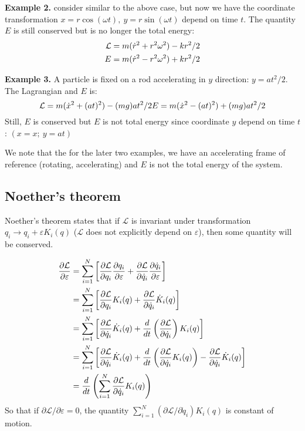 \documentclass{article}
\newcommand{\pfrac}[2]{\frac{\partial #1}{\partial #2}}
\newcommand{\ddt}[1]{\frac{d}{dt}\left( #1 \right)}
\renewcommand{\L}{\mathcal{L}}
\newcommand{\dotx}{\dot{x}}
\newcommand{\dotq}{\dot{q}}
\begin{document}
\textbf{Example 2.}
consider similar to the above case, but now we have the coordinate transformation 
$x = r\cos(\omega t),\ y = r\sin(\omega t)$ depend on time $t$. The quantity
$E$ is still conserved but is no longer the total energy:
\begin{align}
    \L = m(\dot{r}^2 + r^2\omega^2) - kr^2/2 \notag \\
    E = m(\dot{r}^2 - r^2\omega^2) + kr^2/2 \notag
\end{align}

\textbf{Example 3.}
A particle is fixed on a rod accelerating in $y$ direction: $y = at^2 / 2$. The 
Lagrangian and $E$ is:
\begin{equation}
    \L = m(\dotx^2 + (at)^2 ) - (mg)at^2 / 2 \notag \\
    E = m(\dotx^2 - (at)^2 ) + (mg)at^2 / 2 \notag 
\end{equation}
Still, $E$ is conserved but $E$ is not total energy since coordinate $y$ depend on 
time $t$: $(x = x;\ y = a t)$

We note that the for the later two examples, we have an accelerating frame of reference (rotating, accelerating) and 
$E$ is not the total energy of the system.


\subsection{Noether's theorem}
Noether's theorem states that if $\L$ is invariant under transformation 
$q_i \to q_i + \varepsilon K_i(q) $ ($\L$ does not explicitly depend on $\varepsilon$), 
then some quantity will be conserved.

\begin{align}
    \pfrac{\L}{\varepsilon} 
    &= \sum_{i=1}^{N} \left[ \pfrac{\L}{q_i}\pfrac{q_i}{\varepsilon} + \pfrac{\L}{\dotq_i}\pfrac{\dotq_i}{\varepsilon} \right] \notag \\
    &= \sum_{i=1}^{N} \left[ \pfrac{\L}{q_i} K_i(q) + \pfrac{\L}{\dotq_i} \dot{K}_i(q) \right] \notag \\
    &= \sum_{i=1}^{N} \left[ \pfrac{\L}{\dotq_i} \dot{K}_i(q) + \ddt{\pfrac{\L}{\dotq_i}}K_i(q) \right] \notag \\
    &= \sum_{i=1}^{N} \left[ \pfrac{\L}{\dotq_i} \dot{K}_i(q) + \ddt{\pfrac{\L}{\dotq_i}K_i(q)} - \pfrac{\L}{\dotq_i}\dot{K}_i(q)  \right] \notag \\
    &= \ddt{ \sum_{i=1}^{N} \pfrac{\L}{\dotq_i}K_i(q) }
\end{align}
So that if $\partial \L / \partial \varepsilon = 0$, the quantity $\sum_{i=1}^{N} (\partial \L / \partial \dotq_i) K_i(q) $ is constant of motion.
\end{document}
